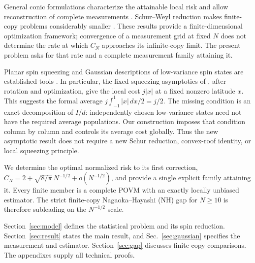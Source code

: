 \documentclass[aps,pra,reprint,superscriptaddress]{revtex4-2}
\theoremstyle{remark}
\begin{document}
General conic formulations characterize the attainable local risk and
allow reconstruction of complete measurements
\cite{HayashiOuyang2023}. Schur--Weyl reduction makes finite-copy
problems considerably smaller \cite{ZhangHayashi2026}. These results
provide a finite-dimensional optimization framework; convergence of a
measurement grid at fixed $N$ does not determine the rate at which
$C_N$ approaches its infinite-copy limit. The present problem asks for
that rate and a complete measurement family attaining it.

Planar spin squeezing and Gaussian descriptions of low-variance spin
states are established tools \cite{He2011,Dammeier2015}.
In particular, the fixed-squeezing asymptotics of
\cite[Theorem~4]{Dammeier2015}, after rotation and optimization, give
the local cost $j|x|$ at a fixed nonzero latitude $x$.
This suggests the formal average $j\int_{-1}^1|x|\,dx/2=j/2$.
The missing condition is an exact decomposition of $I/d$: independently
chosen low-variance states need not have the required average
populations. Our construction imposes that condition column by column
and controls its average cost globally. Thus the new asymptotic result
does not require a new Schur reduction, convex-roof identity, or local
squeezing principle.


We determine the optimal normalized risk to its first correction,
$C_N=2+\sqrt{8/\pi}\,N^{-1/2}+o(N^{-1/2})$, and provide a single
explicit family attaining it. Every finite member is a complete
POVM with an exactly locally unbiased estimator. The strict
finite-copy Nagaoka--Hayashi (NH) gap for $N\geq10$ is therefore
subleading on the $N^{-1/2}$ scale.

Section~\ref{sec:model} defines the statistical problem and its
spin reduction. Section~\ref{sec:result} states the main result,
and Sec.~\ref{sec:gaussian} specifies the measurement and estimator.
Section~\ref{sec:gap} discusses finite-copy comparisons.
The appendixes supply all technical proofs.
\end{document}
